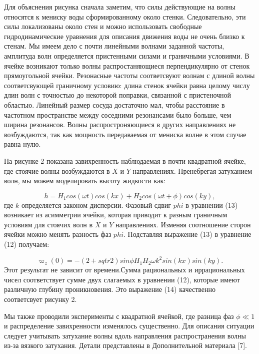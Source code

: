 Для объяснения рисунка сначала заметим, что силы действующие на волны относятся к мениску воды сформированному около стенки. Следовательно, эти силы локализованы около стен и можно использовать свободные гидродинамические уравнения для описания движения воды не очень близко к стенам. Мы имеем дело с почти линейными волнами заданной частоты, амплитуда волн определяется пристенными силами и граничными условиями. В ячейке возникают только волны распростаняющиеся перпендикулярно от стенок прямоугольной ячейки. Резонасные частоты соответсвуют волнам с длиной волны соответсвующей граничному условию: длина стенок ячейки равна целому числу длин волн с точностью до некоторой поправки, связанной с пристеночной областью. Линейный размер сосуда достаточно мал, чтобы расстояние в частотном пространстве между соседними резонансами было больше, чем ширина резонансов.  Волны распростроняющиеся в других направлениях не возбуждаются, так как мощность передаваемая от мениска волне в этом случае равна нулю.

На рисунке 2 показана завихренность наблюдаемая в почти квадратной ячейке, где стоячие волны возбуждаются в $X$ и $Y$ направлениях. Пренебрегая затуханием волн, мы можем моделировать высоту жидкости как:

\begin{equation}
h = H_1 cos(\omega t) cos(kx) + H_2 cos(\omega t + \phi) cos(ky),
\end{equation}
где $k$ определяется законом дисперсии. Фазовый сдвиг $phi$ в уравнении (13) возникает из асимметрии ячейки, которая приводит к разным граничным условиям для стоячих волн в $X$ и $Y$ направлениях. Изменяя соотношение сторон ячейки можно менять разность фаз $phi$. Подставляя выражение (13) в уравнение (12) получаем:

\begin{equation}
\varpi_z(0) = -(2 + sqtr{2})sin \phi H_1 H_2 \omega k^2 sin(kx)sin(ky).
\end{equation}
Этот результат не зависит от времени.Сумма рациональных и иррациональных чисел соответствует сумме двух слагаемых в уравнении (12), которые имеют различную глубину проникновения. Это выражение (14) качественно соответсвует рисунку 2.

Мы также проводили эксперименты с квадратной ячейкой, где разница фаз $\phi \ll 1$  и распределение завихренности изменялось существенно. Для описания ситуации следует учитывать затухание волны вдоль направления распространения волны из-за вязкого затухания. Детали представлены в Дополнительной материала [7].

